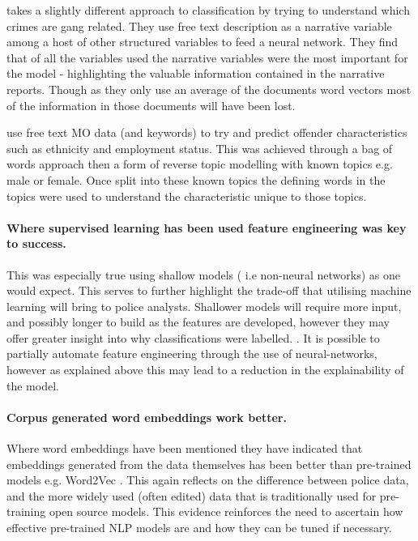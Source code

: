 \textcite{seo2018partially} takes a slightly different approach to classification by trying to understand which crimes are gang related. They use free text description as a narrative variable among a host of other structured variables to feed a neural network. They find that of all the variables used the narrative variables were the most important for the model - highlighting the valuable information contained in the narrative reports. Though as they only use an average of the documents word vectors most of the information in those documents will have been lost.

\textcite{bache2010language}  use free text MO data (and keywords) to try and predict offender characteristics such as ethnicity and employment status. This was achieved through a bag of words approach then a form of reverse topic modelling with known topics e.g. male or female. Once split into these known topics the defining words in the topics were used to understand the characteristic unique to those topics. 

\paragraph{Where supervised learning has been used feature engineering was key to success.} This was especially true using shallow models ( i.e non-neural networks) as one would expect. This serves to further highlight the trade-off that utilising machine learning will bring to police analysts. Shallower models will require more input, and possibly longer to build as the features are developed, however they may offer greater insight into why classifications were labelled. \parencite{vandePutte2009425, Bachenko200841,Ku201318}. It is possible to partially automate feature engineering through the use of neural-networks, however as explained above this may lead to a reduction in the explainability of the model.

\paragraph{Corpus generated word embeddings work better.} Where word embeddings have been mentioned they have indicated that embeddings generated from the data themselves has been better than pre-trained models e.g. Word2Vec \parencite{Schraagen201979,Haleem20192279}. This again reflects on the difference between police data, and the more widely used (often edited) data that is traditionally used for pre-training open source models. This evidence reinforces the need to ascertain how effective pre-trained NLP models are and how they can be tuned if necessary.

